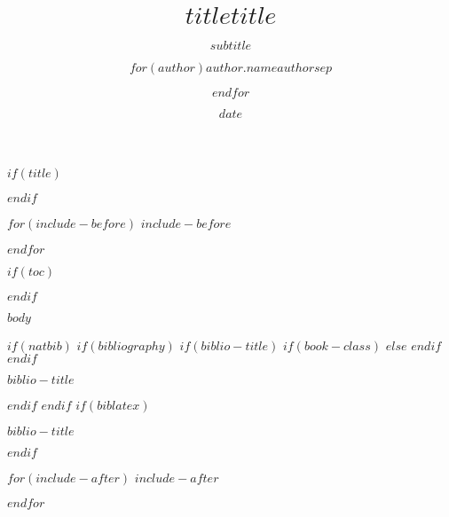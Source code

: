 \documentclass[$if(fontsize)$$fontsize$,$endif$$if(handout)$handout,$endif$$if(t)$t,$endif$$if(aspectratio)$aspectratio=$aspectratio$,$endif$]{beamer}
\title[$stitle$]{\vfill $title$}
\title{\vfill $title$}
\subtitle{$subtitle$}
\author[$sauthor$]{$for(author)$$author.name$\inst{$author.inst$}$authorsep$ \and $endfor$}
\institute{$for(institute)$\inst{$institute.inst$} $institute.institute$ \and $endfor$}
\date{$date$}
\newif\ifbibliography
\begin{document}
$if(title)$
\begin{frame}
\titlepage
\end{frame}
$endif$

$for(include-before)$
$include-before$

$endfor$

$if(toc)$
\begin{frame}
\tableofcontents[hideallsubsections]
\end{frame}

$endif$

$body$

$if(natbib)$
$if(bibliography)$
$if(biblio-title)$
$if(book-class)$
\renewcommand\bibname{$biblio-title$}
$else$
\renewcommand\refname{$biblio-title$}
$endif$
$endif$
\begin{frame}[allowframebreaks]{$biblio-title$}
\bibliographytrue

\end{frame}

$endif$
$endif$
$if(biblatex)$
\begin{frame}[allowframebreaks]{$biblio-title$}
\bibliographytrue
\printbibliography[heading=none]
\end{frame}
$endif$

$for(include-after)$
$include-after$

$endfor$
\end{document}
